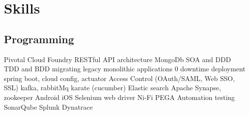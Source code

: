 \documentclass[]{deedy-resume-openfont}
\begin{document}
%
%
\lastupdated

%
%

%
%

\begin{minipage}[t]{0.33\textwidth} 



\section{Skills}
\subsection{Programming}

 \textbullet{} Pivotal Cloud Foundry \newline 
 \textbullet{} RESTful API architecture \newline
  \textbullet{} MongoDb \newline
 \textbullet{} SOA and DDD \newline 
 \textbullet{} TDD and BDD \newline 
 \textbullet{} migrating legacy monolithic applications \newline
 \textbullet{} 0 downtime deployment \newline 
 \textbullet{} spring boot, cloud config, actuator \newline 
 \textbullet{} Access Control (OAuth/SAML, Web SSO, SSL) \newline 
 \textbullet{} kafka, rabbitMq \newline 
 \textbullet{} karate (cucumber) \newline 
 \textbullet{} Elastic search \newline 
 \textbullet{} Apache Synapse, zookeeper \newline 
 \textbullet{} Android \textbullet{} iOS \newline 
 \textbullet{} Selenium web driver \newline 
 \textbullet{} Ni-Fi \textbullet{} PEGA \newline 
 \textbullet{} Automation testing \newline 
 \textbullet{} SonarQube \textbullet{} Splunk \textbullet{} Dynatrace
\sectionsep


\end{minipage}
\end{document}
